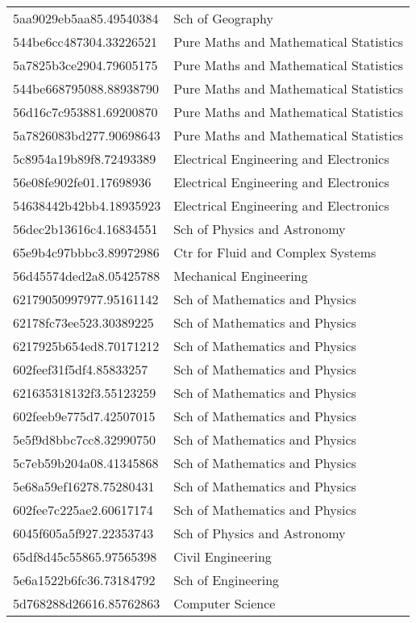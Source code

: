 \begin{tabular}{ll}
5aa9029eb5aa85.49540384 & Sch of Geography \\
544be6cc487304.33226521 & Pure Maths and Mathematical Statistics \\
5a7825b3ce2904.79605175 & Pure Maths and Mathematical Statistics \\
544be668795088.88938790 & Pure Maths and Mathematical Statistics \\
56d16c7c953881.69200870 & Pure Maths and Mathematical Statistics \\
5a7826083bd277.90698643 & Pure Maths and Mathematical Statistics \\
5c8954a19b89f8.72493389 & Electrical Engineering and Electronics \\
56e08fe902fe01.17698936 & Electrical Engineering and Electronics \\
54638442b42bb4.18935923 & Electrical Engineering and Electronics \\
56dec2b13616c4.16834551 & Sch of Physics and Astronomy \\
65e9b4c97bbbc3.89972986 & Ctr for Fluid and Complex Systems \\
56d45574ded2a8.05425788 & Mechanical Engineering \\
62179050997977.95161142 & Sch of Mathematics and Physics \\
62178fc73ee523.30389225 & Sch of Mathematics and Physics \\
6217925b654ed8.70171212 & Sch of Mathematics and Physics \\
602feef31f5df4.85833257 & Sch of Mathematics and Physics \\
621635318132f3.55123259 & Sch of Mathematics and Physics \\
602feeb9e775d7.42507015 & Sch of Mathematics and Physics \\
5e5f9d8bbc7cc8.32990750 & Sch of Mathematics and Physics \\
5c7eb59b204a08.41345868 & Sch of Mathematics and Physics \\
5e68a59ef16278.75280431 & Sch of Mathematics and Physics \\
602fee7c225ae2.60617174 & Sch of Mathematics and Physics \\
6045f605a5f927.22353743 & Sch of Physics and Astronomy \\
65df8d45c55865.97565398 & Civil Engineering \\
5e6a1522b6fc36.73184792 & Sch of Engineering \\
5d768288d26616.85762863 & Computer Science \\

\end{tabular}
